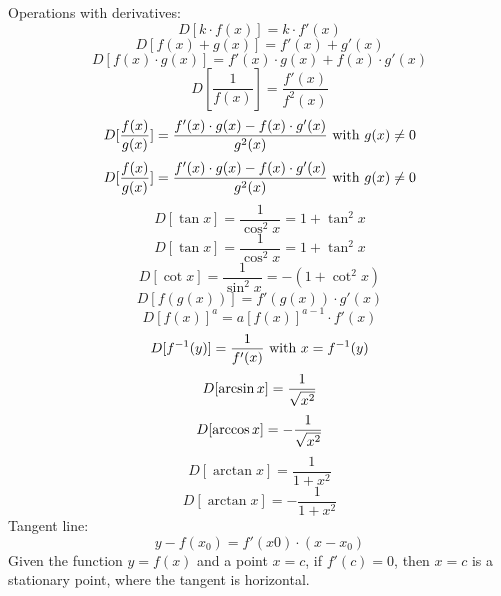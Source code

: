 \documentclass{article}
\begin{document}
Operations with derivatives:
\begin{equation}
D [k\cdot f(x)] = k\cdot f'(x)
\end{equation}
\begin{equation}
D [f(x) + g(x)] = f'(x) + g'(x)
\end{equation}
\begin{equation}
D [f(x)\cdot g(x)] = f'(x) \cdot g(x) + f(x) \cdot g'(x)
\end{equation}
\begin{equation}
D [\frac{1}{f(x)}] = \frac{f'(x)}{f^2(x)}
\end{equation}
\begin{equation}
D [\frac{f(x)}{g(x)}] = \frac{f'(x) \cdot g(x) - f(x) \cdot g'(x)}{g^2(x)} \textnormal{ with } g(x) \neq 0
\end{equation}
\begin{equation}
D [\frac{f(x)}{g(x)}] = \frac{f'(x) \cdot g(x) - f(x) \cdot g'(x)}{g^2(x)} \textnormal{ with } g(x) \neq 0
\end{equation}
\begin{equation}
D [\tan{x}] = \frac{1}{\cos^2{x}} = 1 + \tan^2{x}
\end{equation}
\begin{equation}
D [\tan{x}] = \frac{1}{\cos^2{x}} = 1 + \tan^2{x}
\end{equation}
\begin{equation}
D [\cot{x}] = \frac{1}{\sin^2{x}} = -(1 + \cot^2{x})
\end{equation}
\begin{equation}
D [f(g(x))] = f'(g(x))\cdot g'(x)
\end{equation}
\begin{equation}
D [f(x)]^a = a[f(x)]^{a-1}\cdot f'(x)
\end{equation}
\begin{equation}
D [f^{-1}(y)] = \frac{1}{f'(x)} \textnormal{ with } x = f^{-1}(y)
\end{equation}
\begin{equation}
D [\arcsin{x}] = \frac{1}{\sqrt{\-x^2}}
\end{equation}
\begin{equation}
D [\arccos{x}] = -\frac{1}{\sqrt{\-x^2}}
\end{equation}
\begin{equation}
D [\arctan{x}] = \frac{1}{1+x^2}
\end{equation}
\begin{equation}
D [\arctan{x}] = -\frac{1}{1+x^2}
\end{equation}
Tangent line:
\begin{equation}
y - f(x_0) = f'(x0)\cdot (x - x_0)
\end{equation}
Given the function $y = f(x)$ and a point $x = c$, if $f'(c) = 0$, then $x = c$ is a stationary point, where the tangent is horizontal.
\end{document}
